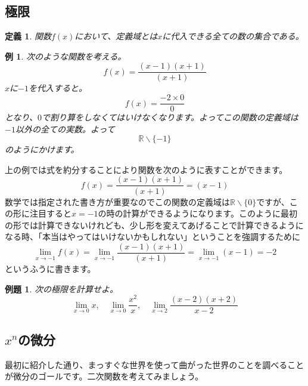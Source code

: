 \documentclass{ltjsarticle}
\newtheorem{definition}{定義}[section]
\newtheorem{problem}{例題}
\newtheorem{example}{例}[section]
\newcommand*{\R}{\mathbb{R}}
\begin{document}
\subsection{極限}
\begin{definition}
関数$f(x)$において、定義域とは$x$に代入できる全ての数の集合である。
\end{definition}

\begin{example}
次のような関数を考える。
\begin{equation*}
f(x) = {\frac {(x-1)(x+1)} {(x+1)}}
\end{equation*}
$x$に$-1$を代入すると。
\begin{equation*}
f(x) = {\frac {-2\times 0} {0}}
\end{equation*}
となり、$0$で割り算をしなくてはいけなくなります。よってこの関数の定義域は$-1$以外の全ての実数。よって
\begin{equation*}
\R\backslash\{-1\}
\end{equation*}
のようにかけます。
\end{example}

上の例では式を約分することにより関数を次のように表すことができます。
\begin{equation*}
f(x) = {\frac {(x-1)(x+1)} {(x+1)}}=(x-1)
\end{equation*}
数学では指定された書き方が重要なのでこの関数の定義域は$\R\backslash\{0\}$ですが、この形に注目すると$x=-1$の時の計算ができるようになります。このように最初の形では計算できないけれども、少し形を変えてあげることで計算できるようになる時、「本当はやってはいけないかもしれない」ということを強調するために
\begin{equation*}
\lim_{x\to-1}f(x) = \lim_{x\to-1}{\frac {(x-1)(x+1)} {(x+1)}} =\lim_{x\to-1}(x-1)= -2
\end{equation*}
というふうに書きます。

\begin{problem}
次の極限を計算せよ。
\begin{equation*}
\lim_{x\to 0} x, \quad\lim_{x\to 0} {\frac {x^2} x}, \quad\lim_{x\to 2} {\frac {(x-2)(x+2)}{x-2}}
\end{equation*}
\end{problem}

\subsection{$x^n$の微分}

最初に紹介した通り、まっすぐな世界を使って曲がった世界のことを調べることが微分のゴールです。二次関数を考えてみましょう。
\begin{center}
\end{center}
\end{document}
